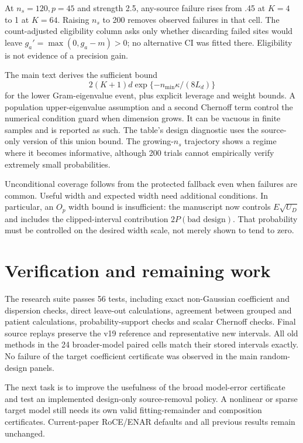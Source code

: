 \documentclass[11pt]{article}
\begin{document}
At $n_s=120,p=45$ and strength 2.5, any-source failure rises from .45 at $K=4$
to 1 at $K=64$. Raising $n_s$ to 200 removes observed failures in that cell.
The count-adjusted eligibility column asks only whether discarding failed
sites would leave $g_a'=\max(0,g_a-m)>0$; no alternative CI was fitted there.
Eligibility is not evidence of a precision gain.

The main text derives the sufficient bound
\[
 2(K+1)d\exp\{-n_{\min}\kappa/(8L_d)\}
\]
for the lower Gram-eigenvalue event, plus explicit leverage and weight bounds.
A population upper-eigenvalue assumption and a second Chernoff term control
the numerical condition guard when dimension grows. It can be
vacuous in finite samples and is reported as such. The table's design diagnostic
uses the source-only version of this union bound. The growing-$n_s$ trajectory
shows a regime where it becomes informative, although 200 trials cannot
empirically verify extremely small probabilities.

Unconditional coverage follows from the protected fallback even when failures
are common. Useful width and expected width need additional conditions. In
particular, an $O_p$ width bound is insufficient: the manuscript now controls
$E\sqrt{U_D}$ and includes the clipped-interval contribution
$2P(\text{bad design})$. That probability must be controlled on the desired
width scale, not merely shown to tend to zero.

\section{Verification and remaining work}

The research suite passes 56 tests, including exact non-Gaussian coefficient
and dispersion checks, direct leave-out calculations, agreement between grouped and patient
calculations, probability-support checks and scalar Chernoff checks. Final source
replays preserve the v19 reference and representative new intervals. All old
methods in the 24 broader-model paired cells match their stored intervals
exactly. No failure of the target coefficient certificate was observed in the main
random-design panels.

The next task is to improve the usefulness of the broad model-error certificate
and test an implemented design-only source-removal policy. A nonlinear or
sparse target model still needs its own valid fitting-remainder and composition
certificates. Current-paper RoCE/ENAR defaults and all previous results remain
unchanged.
\end{document}
